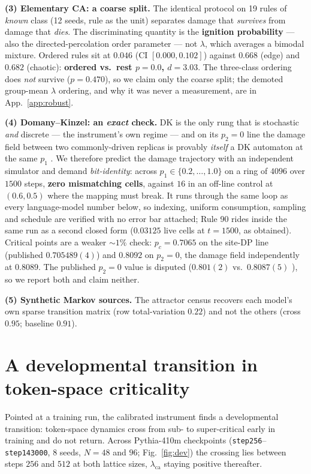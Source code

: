 \documentclass{article}
\newcommand{\lca}{\ensuremath{\lambda_{\mathrm{ca}}}}
\begin{document}
\textbf{(3) Elementary CA: a coarse split.} The identical protocol on 19 rules of \emph{known}
class (12 seeds, rule as the unit) separates damage that \emph{survives} from damage that
\emph{dies}. The discriminating quantity is the \textbf{ignition probability} --- also the
directed-percolation order parameter \citep{grassberger1995} --- not $\lambda$, which averages a
bimodal mixture. Ordered rules sit at $0.046$ (CI $[0.000,0.102]$) against $0.668$ (edge) and
$0.682$ (chaotic): \textbf{ordered vs.\ rest $p{=}0.0$, $d{=}3.03$}. The three-class ordering does
\emph{not} survive ($p{=}0.470$), so we claim only the coarse split; the demoted group-mean
$\lambda$ ordering, and why it was never a measurement, are in App.~\ref{app:robust}.

\textbf{(4) Domany--Kinzel: an \emph{exact} check.} DK \citep{domany1984} is the only rung that
is stochastic \emph{and} discrete --- the instrument's own regime --- and on its $p_2{=}0$ line
the damage field between two commonly-driven replicas is provably \emph{itself} a DK automaton at
the same $p_1$ \citep{kohring1992}. We therefore predict the damage trajectory with an independent
simulator and demand \emph{bit-identity}: across $p_1\in\{0.2,\dots,1.0\}$ on a ring of $4096$
over $1500$ steps, \textbf{zero mismatching cells}, against $16$ in an off-line control at
$(0.6,0.5)$ where the mapping must break. It runs through the same loop as every language-model
number below, so indexing, uniform consumption, sampling and schedule are verified with no error
bar attached; Rule 90 rides inside the same run as a second closed form ($0.03125$ live cells at
$t{=}1500$, as obtained). Critical points are a weaker $\sim\!1\%$ check: $p_c{=}0.7065$ on the
site-DP line (published $0.705489(4)$) and $0.8092$ on $p_2{=}0$, the damage field independently
at $0.8089$. The published $p_2{=}0$ value is disputed ($0.801(2)$ \citep{zebende1994} vs.\
$0.8087(5)$ \citep{hinrichsen1997}), so we report both and claim neither.

\textbf{(5) Synthetic Markov sources.} The attractor census recovers each model's own sparse
transition matrix (row total-variation $0.22$) and not the others (cross $0.95$; baseline
$0.91$).


\section{A developmental transition in token-space criticality}\label{sec:dev}
Pointed at a training run, the calibrated instrument finds a developmental transition:
token-space dynamics cross from sub- to super-critical early in training and do not return.
Across Pythia-410m checkpoints (\texttt{step256}--\texttt{step143000}, 8 seeds, $N{=}48$ and
$96$; Fig.~\ref{fig:dev}) the crossing lies between steps $256$ and $512$ at both lattice sizes,
$\lca$ staying positive thereafter.
\end{document}
